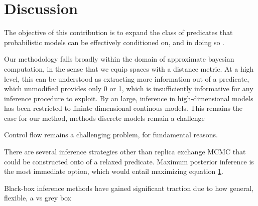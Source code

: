 \section{Discussion}

The objective of this contribution is to expand the class of predicates that probabilistic models can be effectively conditioned on, and in doing so .

Our methodology falls broadly within the domain of approximate bayesian computation, in the sense that we equip spaces with a distance metric.
At a high level, this can be understood as extracting more information out of a predicate, which unmodified provides only 0 or 1, which is insufficiently informative for any inference procedure to exploit.
By an large, inference in high-dimensional models has been restricted to fininte dimensional continous models.
This remains the case for our method, methods discrete models remain a challenge

Control flow remains a challenging problem, for fundamental reasons.


There are several inference strategies other than replica exchange MCMC that could be constructed onto of a relaxed predicate.
Maximum posterior inference is the most immediate option, which would entail maximizing equation \ref{}.

Black-box inference methods have gained significant traction due to how general, flexible, a vs grey box


